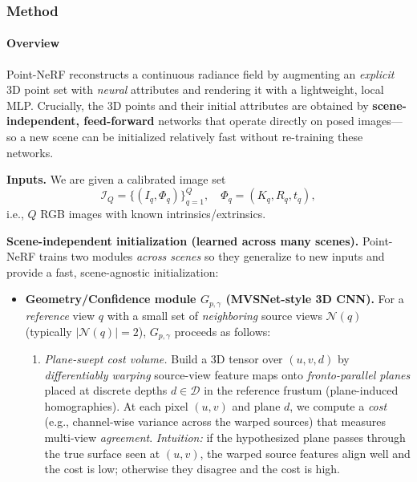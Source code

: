 \begin{enrichment}
\begin{enrichment}
\begin{enrichment}
        \subsubsection{Method}
        \label{subsec:chapter23_pointnerf_method}
        
        \paragraph{Overview}
        Point-NeRF reconstructs a continuous radiance field by augmenting an \emph{explicit} 3D point set with \emph{neural} attributes and rendering it with a lightweight, local MLP. Crucially, the 3D points and their initial attributes are obtained by \textbf{scene-independent, feed-forward} networks that operate directly on posed images—so a new scene can be initialized relatively fast without re-training these networks.
        
        \medskip\noindent
        \textbf{Inputs.} We are given a calibrated image set
        \[
        \mathcal{I}_Q=\{(I_q,\Phi_q)\}_{q=1}^{Q},\quad \Phi_q=(K_q,R_q,t_q),
        \]
        i.e., $Q$ RGB images with known intrinsics/extrinsics.
        
        \newpage
        \noindent
        \textbf{Scene-independent initialization (learned across many scenes).}
        Point-NeRF trains two modules \emph{across scenes} so they generalize to new inputs and provide a fast, scene-agnostic initialization:
        
        \begin{itemize}
            \item \textbf{Geometry/Confidence module $G_{p,\gamma}$ (MVSNet-style 3D CNN).}
            For a \emph{reference} view $q$ with a small set of \emph{neighboring} source views $\mathcal{N}(q)$ (typically $|\mathcal{N}(q)|{=}2$), $G_{p,\gamma}$ proceeds as follows:
            \begin{enumerate}
                \item \emph{Plane-swept cost volume.} Build a 3D tensor over $(u,v,d)$ by \emph{differentiably warping} source-view feature maps onto \emph{fronto-parallel planes} placed at discrete depths $d\!\in\!\mathcal{D}$ in the reference frustum (plane-induced homographies).
                At each pixel $(u,v)$ and plane $d$, we compute a \emph{cost} (e.g., channel-wise variance across the warped sources) that measures multi-view \emph{agreement}. 
                \emph{Intuition:} if the hypothesized plane passes through the true surface seen at $(u,v)$, the warped source features align well and the cost is low; otherwise they disagree and the cost is high.
                

\end{enumerate}
\end{itemize}
\end{enrichment}
\end{enrichment}
\end{enrichment}
